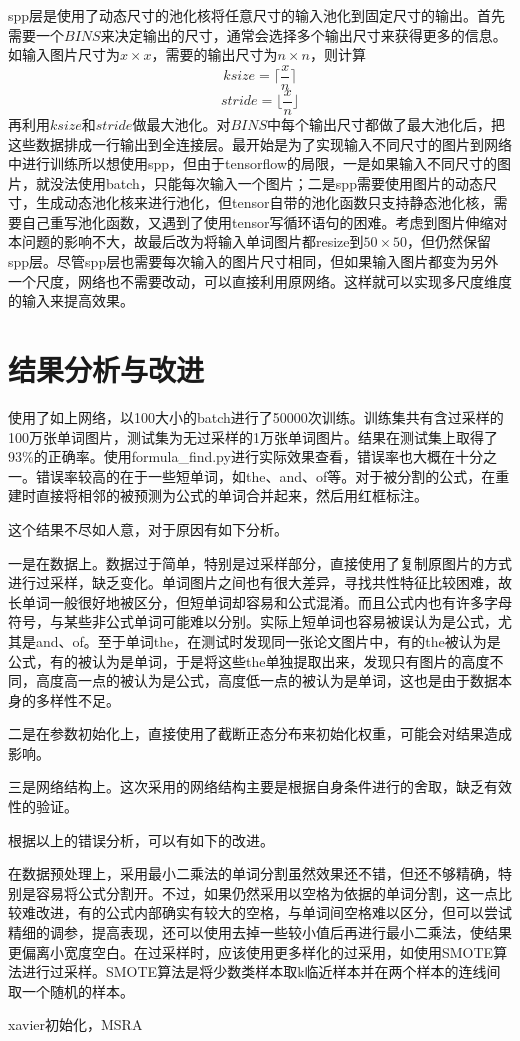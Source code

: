 \documentclass[12pt]{article}
\begin{document}
spp层是使用了动态尺寸的池化核将任意尺寸的输入池化到固定尺寸的输出。首先需要一个$BINS$来决定输出的尺寸，通常会选择多个输出尺寸来获得更多的信息。如输入图片尺寸为$x \times x$，需要的输出尺寸为$n \times n$，则计算
$$ksize = \lceil \frac x n \rceil$$
$$stride = \lfloor \frac x n \rfloor$$
再利用$ksize$和$stride$做最大池化。对$BINS$中每个输出尺寸都做了最大池化后，把这些数据排成一行输出到全连接层。\cite{spp}最开始是为了实现输入不同尺寸的图片到网络中进行训练所以想使用spp，但由于tensorflow的局限，一是如果输入不同尺寸的图片，就没法使用batch，只能每次输入一个图片；二是spp需要使用图片的动态尺寸，生成动态池化核来进行池化，但tensor自带的池化函数只支持静态池化核，需要自己重写池化函数，又遇到了使用tensor写循环语句的困难。考虑到图片伸缩对本问题的影响不大，故最后改为将输入单词图片都resize到$50 \times 50$，但仍然保留spp层。尽管spp层也需要每次输入的图片尺寸相同，但如果输入图片都变为另外一个尺度，网络也不需要改动，可以直接利用原网络。这样就可以实现多尺度维度的输入来提高效果。

\newpage
\section{结果分析与改进}
\noindent

使用了如上网络，以100大小的batch进行了50000次训练。训练集共有含过采样的100万张单词图片，测试集为无过采样的1万张单词图片。结果在测试集上取得了93\%的正确率。使用formula\_find.py进行实际效果查看，错误率也大概在十分之一。错误率较高的在于一些短单词，如the、and、of等。对于被分割的公式，在重建时直接将相邻的被预测为公式的单词合并起来，然后用红框标注。

这个结果不尽如人意，对于原因有如下分析。

一是在数据上。数据过于简单，特别是过采样部分，直接使用了复制原图片的方式进行过采样，缺乏变化。单词图片之间也有很大差异，寻找共性特征比较困难，故长单词一般很好地被区分，但短单词却容易和公式混淆。而且公式内也有许多字母符号，与某些非公式单词可能难以分别。实际上短单词也容易被误认为是公式，尤其是and、of。至于单词the，在测试时发现同一张论文图片中，有的the被认为是公式，有的被认为是单词，于是将这些the单独提取出来，发现只有图片的高度不同，高度高一点的被认为是公式，高度低一点的被认为是单词，这也是由于数据本身的多样性不足。

二是在参数初始化上，直接使用了截断正态分布来初始化权重，可能会对结果造成影响。

三是网络结构上。这次采用的网络结构主要是根据自身条件进行的舍取，缺乏有效性的验证。

根据以上的错误分析，可以有如下的改进。

在数据预处理上，采用最小二乘法的单词分割虽然效果还不错，但还不够精确，特别是容易将公式分割开。不过，如果仍然采用以空格为依据的单词分割，这一点比较难改进，有的公式内部确实有较大的空格，与单词间空格难以区分，但可以尝试精细的调参，提高表现，还可以使用去掉一些较小值后再进行最小二乘法，使结果更偏离小宽度空白。在过采样时，应该使用更多样化的过采用，如使用SMOTE算法进行过采样。SMOTE算法是将少数类样本取k临近样本并在两个样本的连线间取一个随机的样本。

xavier初始化，MSRA

\newpage

\end{document}
